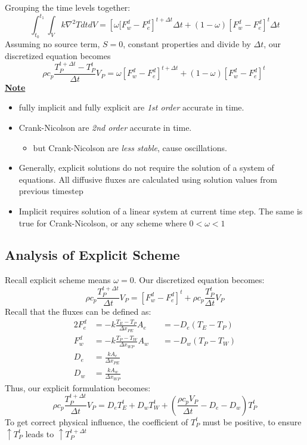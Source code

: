 \documentclass[14pt]{article}
\begin{document}
Grouping the time levels together:
\begin{equation}
 \int_{t_0}^{t_1} \int_{V} k \nabla^2 T dt dV = \left[\omega[F_w^d-F_e^d \right ]^{t+\Delta t}\Delta t +
 (1-\omega)\left [F_w^d - F_e^d \right ]^t\Delta t
\end{equation}
Assuming no source term, \(S = 0\), constant properties and divide by \(\Delta t\), our discretized equation becomes
 \begin{equation}
\rho c_p \frac{T_P^{t+\Delta t} - T_P^t}{\Delta t} V_P = \omega \left[F_w^d-F_e^d \right ]^{t+\Delta t} +
  (1-\omega)\left [F_w^d - F_e^d \right ]^t\
 \end{equation}
\textbf{\uline{Note}}
\begin{itemize}
\item fully implicit and fully explicit are \emph{1st order} accurate in time.
\item Crank-Nicolson are \emph{2nd order} accurate in time.
\begin{itemize}
\item but Crank-Nicolson are \emph{less stable}, cause oscillations.
\end{itemize}
\item Generally, explicit solutions do not require the solution of a system of equations. All diffusive fluxes are calculated using solution values from previous timestep
\item Implicit requires solution of a linear system at current time step. The same is true for Crank-Nicolson, or any scheme where \(0<\omega < 1\)
\end{itemize}
\subsection{Analysis of Explicit Scheme}
\label{sec:org3b2f0ba}
Recall explicit scheme means \(\omega = 0\). Our discretized equation becomes:
\begin{equation}
\rho c_p \frac{T_P ^{t+\Delta t}}{\Delta t} V_P = [F_w^d-F_e^d]^t + \rho c_p \frac{T_P^t}{\Delta t}V_P 
\end{equation}
Recall that the fluxes can be defined as:
\begin{alignat}{2}
F_{e}^d &= - k\frac{T_E-T_P}{\Delta x_{PE}}A_e &&= -D_e(T_E- T_P)\\
F_{w}^d &= - k\frac{T_P-T_W}{\Delta x_{WP}}A_w &&= -D_w(T_P- T_W)\\
D_e &= \frac{kA_e}{\Delta x_{PE}}\\
D_w &= \frac{kA_w}{\Delta x_{WP}}
\end{alignat}
Thus, our explicit formulation becomes:
\begin{equation}
\rho c_p \frac{T_P ^{t+\Delta t}}{\Delta t} V_P = D_eT_E^t + D_wT_W^t + \left ( \frac{\rho c_p V_P}{\Delta t} - D_e - D_w \right)T_P^t 
\end{equation}
To get correct physical influence, the coefficient of \(T_P^t\) must be positive, to ensure \(\uparrow T_P^t\) leads to \(\uparrow T_P^{t+\Delta t}\)
\end{document}
